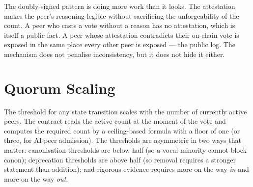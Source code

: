 \documentclass[11pt,a4paper]{article}
\begin{document}
The doubly-signed pattern is doing more work than it looks. The
attestation makes the peer's reasoning legible without
sacrificing the unforgeability of the count. A peer who casts a
vote without a reason has no attestation, which is itself a
public fact. A peer whose attestation contradicts their
on-chain vote is exposed in the same place every other peer is
exposed --- the public log. The mechanism does not penalise
inconsistency, but it does not hide it either.

\section{Quorum Scaling}
\label{sec:quorum}

The threshold for any state transition scales with the number
of currently active peers. The contract reads the active count
at the moment of the vote and computes the required count by a
ceiling-based formula with a floor of one (or three, for
AI-peer admission). The thresholds are asymmetric in two ways
that matter: canonisation thresholds are below half (so a
vocal minority cannot block canon); deprecation thresholds are
above half (so removal requires a stronger statement than
addition); and rigorous evidence requires more on the way
\emph{in} and more on the way \emph{out}.
\end{document}
